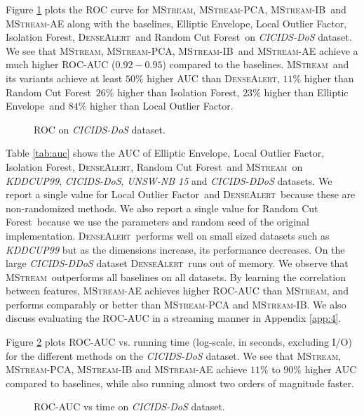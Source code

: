 \documentclass[sigconf]{acmart}
\newcommand{\method}{\textsc{MStream}}
\newcommand{\densealert}{\textsc{DenseAlert}}
\newcommand{\rcf}{Random Cut Forest}
\newcommand{\iso}{Isolation Forest}
\newcommand{\elliptic}{Elliptic Envelope}
\newcommand{\lof}{Local Outlier Factor}
\begin{document}
Figure \ref{fig:ROC} plots the ROC curve for \method, \method-PCA, \method-IB\ and \method-AE along with the baselines, \elliptic, \lof, \iso, \densealert\ and \rcf\ on \emph{CICIDS-DoS} dataset. 
We see that \method, \method-PCA, \method-IB\ and \method-AE achieve a much higher ROC-AUC ($0.92-0.95$) compared to the baselines. \method\ and its variants achieve at least $50\%$ higher AUC than \densealert, $11\%$ higher than \rcf\ $26\%$ higher than \iso, $23\%$ higher than \elliptic\ and  $84\%$ higher than \lof.


\begin{figure}[!htb]
        \caption{\label{fig:ROC} ROC on \emph{CICIDS-DoS} dataset.}
\end{figure}



Table \ref{tab:auc} shows the AUC of \elliptic, \lof, \iso, \densealert, \rcf\ and \method\ on \emph{KDDCUP99}, \emph{CICIDS-DoS}, \emph{UNSW-NB 15} and \emph{CICIDS-DDoS} datasets. We report a single value for \lof\ and \densealert\ because these are non-randomized methods. We also report a single value for \rcf\ because we use the parameters and random seed of the original implementation. \densealert\ performs well on small sized datasets such as \emph{KDDCUP99} but as the dimensions increase, its performance decreases. On the large \emph{CICIDS-DDoS} dataset \densealert\ runs out of memory. We observe that \method\ outperforms all baselines on all datasets. By learning the correlation between features, \method-AE achieves higher ROC-AUC than \method, and performs comparably or better than \method-PCA and \method-IB. We also discuss evaluating the ROC-AUC in a streaming manner in Appendix \ref{app:4}.

Figure \ref{fig:AUC} plots ROC-AUC vs. running time (log-scale, in seconds, excluding I/O) for the different methods on the \emph{CICIDS-DoS} dataset. We see that \method, \method-PCA, \method-IB and \method-AE achieve $11\%$ to $90\%$ higher AUC compared to baselines, while also running almost two orders of magnitude faster.


\begin{figure}[!htb]
        \caption{\label{fig:AUC} ROC-AUC vs time on \emph{CICIDS-DoS} dataset.}
\end{figure}
\end{document}
